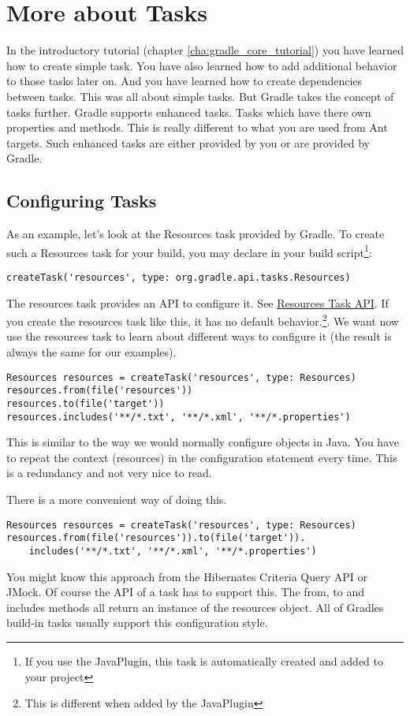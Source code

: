 \chapter{More about Tasks} %
\label{cha:more_about_tasks}
In the introductory tutorial (chapter \ref{cha:gradle_core_tutorial}) you have learned how to create simple task. You have also learned how to add additional behavior to those tasks later on. And you have learned how to create dependencies between tasks. This was all about simple tasks. But Gradle takes the concept of tasks further. Gradle supports enhanced tasks. Tasks which have there own properties and methods. This is really different to what you are used from Ant targets. Such enhanced tasks are either provided by you or are provided by Gradle.

\section{Configuring Tasks} %
\label{sec:configuring_tasks}
As an example, let's look at the Resources task provided by Gradle. To create such a Resources task for your build, you may declare in your build script\footnote{If you use the JavaPlugin, this task is automatically created and added to your project}:
\begin{Verbatim}
createTask('resources', type: org.gradle.api.tasks.Resources)
\end{Verbatim}
The resources task provides an API to configure it. See \href{\API tasks/Resources.html}{Resources Task API}. If you create the resources task like this, it has no default behavior.\footnote{This is different when added by the JavaPlugin}. We want now use the resources task to learn about different ways to configure it (the result is always the same for our examples).
\begin{Verbatim}
Resources resources = createTask('resources', type: Resources)
resources.from(file('resources'))
resources.to(file('target'))
resources.includes('**/*.txt', '**/*.xml', '**/*.properties')	
\end{Verbatim}
This is similar to the way we would normally configure objects in Java. You have to repeat the context (resources) in the configuration statement every time. This is a redundancy and not very nice to read.

There is a more convenient way of doing this.
\begin{Verbatim}
Resources resources = createTask('resources', type: Resources)
resources.from(file('resources')).to(file('target')).
	includes('**/*.txt', '**/*.xml', '**/*.properties')	
\end{Verbatim}
You might know this approach from the Hibernates Criteria Query API or JMock. Of course the API of a task has to support this. The from, to and includes methods all return an instance of the resources object. All of Gradles build-in tasks usually support this configuration style.

